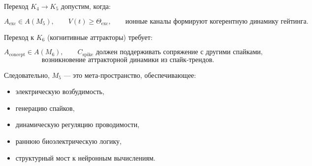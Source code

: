 Переход $K_4 \to K_5$ допустим, когда:

\[
A_{\mathrm{exc}} \in A(M_5),
\qquad
V(t) \ge \Theta_{\mathrm{exc}},
\qquad
\text{ионные каналы формируют когерентную динамику гейтинга}.
\]

Переход к $K_6$ (когнитивные аттракторы) требует:

\[
A_{\mathrm{concept}} \in A(M_6),
\qquad
C_{\mathrm{spike}} \text{ должен поддерживать сопряжение с другими спайками},
\]
\[
\text{возникновение аттракторной динамики из спайк-трендов}.
\]

Следовательно, $M_5$ — это мета-пространство, обеспечивающее:

\begin{itemize}
    \item электрическую возбудимость,
    \item генерацию спайков,
    \item динамическую регуляцию проводимости,
    \item раннюю биоэлектрическую логику,
    \item структурный мост к нейронным вычислениям.
\end{itemize}
